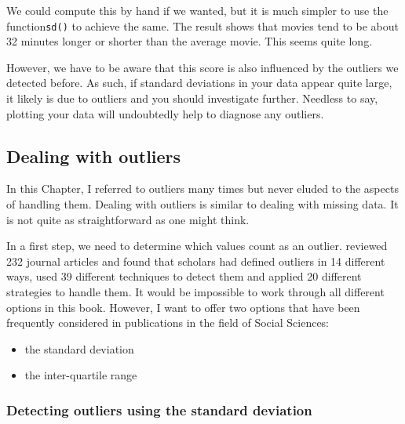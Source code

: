 \documentclass[
]{book}
\newenvironment{Shaded}{\begin{snugshade}}{\end{snugshade}}
\newcommand{\DocumentationTok}[1]{\textcolor[rgb]{0.56,0.35,0.01}{\textbf{\textit{#1}}}}
\newcommand{\FunctionTok}[1]{\textcolor[rgb]{0.00,0.00,0.00}{#1}}
\newcommand{\NormalTok}[1]{#1}
\newcommand{\SpecialCharTok}[1]{\textcolor[rgb]{0.00,0.00,0.00}{#1}}
\begin{document}
We could compute this by hand if we wanted, but it is much simpler to use the function\texttt{sd()} to achieve the same. The result shows that movies tend to be about 32 minutes longer or shorter than the average movie. This seems quite long.

\begin{Shaded}
\end{Shaded}

However, we have to be aware that this score is also influenced by the outliers we detected before. As such, if standard deviations in your data appear quite large, it likely is due to outliers and you should investigate further. Needless to say, plotting your data will undoubtedly help to diagnose any outliers.

\hypertarget{dealing-with-outliers}{%
\subsection{Dealing with outliers}\label{dealing-with-outliers}}

In this Chapter, I referred to outliers many times but never eluded to the aspects of handling them. Dealing with outliers is similar to dealing with missing data. It is not quite as straightforward as one might think.

In a first step, we need to determine which values count as an outlier. \citet{aguinis2013best} reviewed 232 journal articles and found that scholars had defined outliers in 14 different ways, used 39 different techniques to detect them and applied 20 different strategies to handle them. It would be impossible to work through all different options in this book. However, I want to offer two options that have been frequently considered in publications in the field of Social Sciences:

\begin{itemize}
\item
  the standard deviation
\item
  the inter-quartile range
\end{itemize}

\hypertarget{ouliers-standard_deviation}{%
\subsubsection{Detecting outliers using the standard deviation}\label{ouliers-standard_deviation}}
\end{document}
